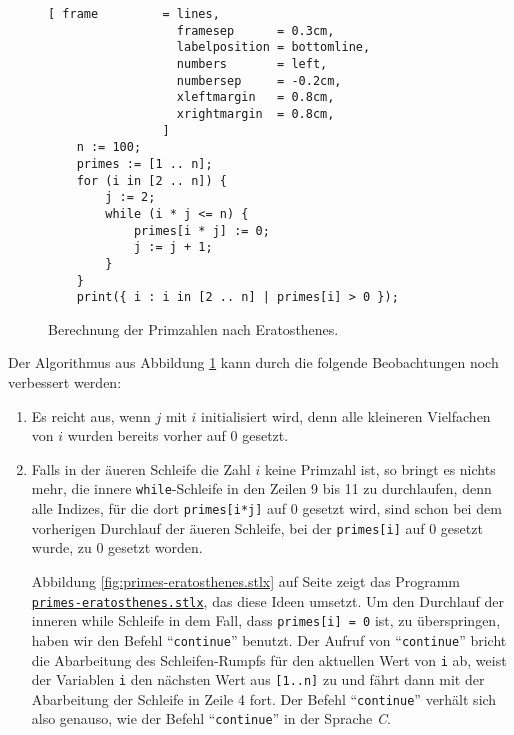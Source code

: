 \begin{figure}[!ht]
  \centering
\begin{Verbatim}[ frame         = lines, 
                  framesep      = 0.3cm, 
                  labelposition = bottomline,
                  numbers       = left,
                  numbersep     = -0.2cm,
                  xleftmargin   = 0.8cm,
                  xrightmargin  = 0.8cm,
                ]
    n := 100;
    primes := [1 .. n];
    for (i in [2 .. n]) {
        j := 2;
        while (i * j <= n) {
            primes[i * j] := 0;
            j := j + 1;
        }
    }
    print({ i : i in [2 .. n] | primes[i] > 0 });
\end{Verbatim} 
\vspace*{-0.3cm}
\caption{Berechnung der Primzahlen nach Eratosthenes.}  \label{fig:primes-for.stlx}
\end{figure} %

Der Algorithmus aus Abbildung \ref{fig:primes-for.stlx} kann durch die folgende Beobachtungen
noch verbessert werden: 
\begin{enumerate}
\item Es reicht aus, wenn $j$ mit $i$ initialisiert wird, denn alle kleineren Vielfachen von $i$
      wurden bereits vorher auf 0 gesetzt.
\item Falls in der \"{a}u\3eren Schleife die Zahl $i$ keine Primzahl ist, so bringt es nichts mehr, die
      innere \texttt{while}-Schleife in den Zeilen 9 bis 11 zu durchlaufen, denn alle
      Indizes, f\"{u}r die dort \texttt{primes[i*j]} auf 0 gesetzt wird, sind schon bei dem
      vorherigen Durchlauf der \"{a}u\3eren Schleife, bei der \texttt{primes[i]}
      auf 0 gesetzt wurde, zu 0 gesetzt worden. 

      Abbildung \ref{fig:primes-eratosthenes.stlx} auf Seite
      \pageref{fig:primes-eratosthenes.stlx} zeigt das Programm
      \href{https://github.com/karlstroetmann/Logik/blob/master/SetlX/primes-eratosthenes.stlx}{\texttt{primes-eratosthenes.stlx}},
      das diese Ideen umsetzt.
      Um den Durchlauf der inneren while Schleife in dem Fall, dass
      \texttt{primes[i] = 0} ist, zu \"{u}berspringen, haben wir den Befehl ``\texttt{continue}''
      benutzt.  Der Aufruf von ``\texttt{continue}'' bricht die Abarbeitung des
      Schleifen-Rumpfs f\"{u}r den aktuellen Wert von \texttt{i} ab, weist der Variablen
      \texttt{i} den n\"{a}chsten Wert aus \texttt{[1..n]} zu und f\"{a}hrt dann mit der
      Abarbeitung der Schleife in Zeile 4 fort.  Der Befehl ``\texttt{continue}'' verh\"{a}lt sich
      also genauso, wie der Befehl ``\texttt{continue}'' in der Sprache \textsl{C}.
\end{enumerate}


